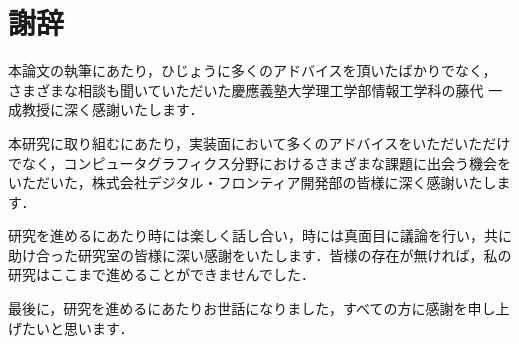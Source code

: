 \chapter*{謝辞}
\label{chap:thanks}
%
%
本論文の執筆にあたり，ひじょうに多くのアドバイスを頂いたばかりでなく，
さまざまな相談も聞いていただいた慶應義塾大学理工学部情報工学科の藤代 一成教授に深く感謝いたします．\\
\par
本研究に取り組むにあたり，実装面において多くのアドバイスをいただいただけでなく，コンピュータグラフィクス分野におけるさまざまな課題に出会う機会をいただいた，株式会社デジタル・フロンティア開発部の皆様に深く感謝いたします．\\
\par
研究を進めるにあたり時には楽しく話し合い，時には真面目に議論を行い，共に助け合った研究室の皆様に深い感謝をいたします．皆様の存在が無ければ，私の研究はここまで進めることができませんでした．\\
\par
最後に，研究を進めるにあたりお世話になりました，すべての方に感謝を申し上げたいと思います．